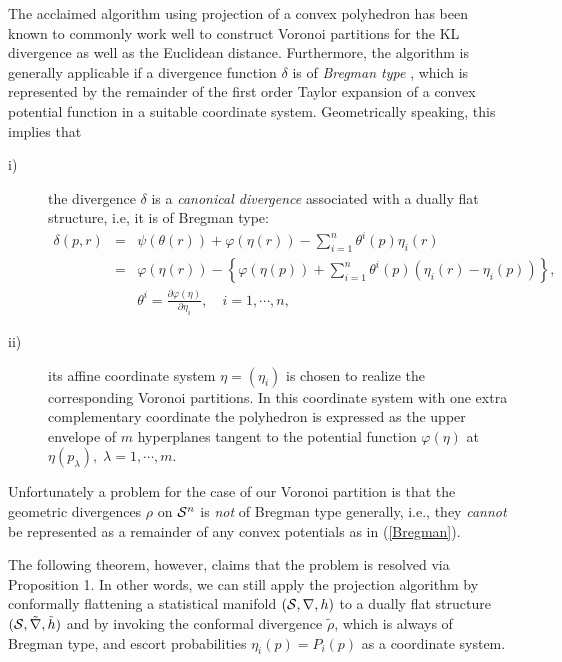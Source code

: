 \documentclass{llncs}
\begin{document}
The acclaimed algorithm using projection of 
a convex polyhedron \cite{ES,Ed} has been known to commonly work well 
to construct Voronoi partitions for the KL divergence \cite{OT,OI,II} 
as well as the Euclidean distance.
Furthermore, the algorithm is generally applicable 
if a divergence function $\delta$ is of {\it Bregman type} \cite{NBN}, 
which is represented by 
the remainder of the first order Taylor expansion of 
a convex potential function in a suitable coordinate system.
Geometrically speaking, this implies that 
\begin{description}
\item[i)] the divergence $\delta$ is a {\em canonical divergence} \cite{AN} 
associated with a dually flat structure, i.e, it is of Bregman type: 
\begin{eqnarray}
	\delta (p,r)
	&=& \psi(\theta(r))+\varphi(\eta(r))
	-\sum_{i=1}^n \theta^i(p) \eta_i(r) \nonumber \\
	&=& \varphi(\eta(r))-\left\{ \varphi(\eta(p)) +\sum_{i=1}^n 
	\theta^i (p)\left( \eta_i(r)-\eta_i(p) \right) \right\}, 
\label{Bregman} \\
	&& \theta^i=\frac{\partial \varphi(\eta)}{\partial \eta_i}, \quad
	i=1,\cdots,n,
	\nonumber
\end{eqnarray}
\item[ii)] its affine coordinate system $\eta=(\eta_i)$ is chosen 
to realize the corresponding Voronoi partitions.
In this coordinate system with one extra complementary coordinate 
the polyhedron is expressed as the upper envelope of 
$m$ hyperplanes tangent to the potential function $\varphi(\eta)$ 
at $\eta(p_\lambda), \; \lambda=1,\cdots,m$.
\end{description}

Unfortunately a problem for the case of our Voronoi partition is that 
the geometric divergences $\rho$ on ${\cal S}^n$ is {\em not} 
of Bregman type generally, i.e., they {\em cannot} be represented 
as a remainder of any convex potentials as in (\ref{Bregman}).

The following theorem, however, claims that the problem is resolved via  
Proposition 1. 
In other words, we can still apply the projection algorithm 
by conformally flattening a statistical manifold 
$({\cal S}, \nabla, h)$ 
to a dually flat structure $({\cal S}, \tilde \nabla,\tilde h)$ and 
by invoking the conformal divergence $\tilde \rho$, which is always 
of Bregman type, 
and escort probabilities $\eta_i(p)=P_i(p)$ as a coordinate system. 
\end{document}
